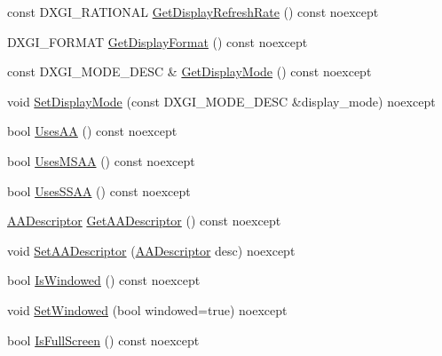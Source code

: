 \begin{DoxyCompactItemize}
\item 
const D\+X\+G\+I\+\_\+\+R\+A\+T\+I\+O\+N\+AL \hyperlink{classmage_1_1rendering_1_1_display_configuration_ae100fc84cd1900e302fb784f429a06b7}{Get\+Display\+Refresh\+Rate} () const noexcept
\item 
D\+X\+G\+I\+\_\+\+F\+O\+R\+M\+AT \hyperlink{classmage_1_1rendering_1_1_display_configuration_a66c6757aa4c17227ab0e7022228f982a}{Get\+Display\+Format} () const noexcept
\item 
const D\+X\+G\+I\+\_\+\+M\+O\+D\+E\+\_\+\+D\+E\+SC \& \hyperlink{classmage_1_1rendering_1_1_display_configuration_af3cd8d29b8f6d6bc0fa1579260badf99}{Get\+Display\+Mode} () const noexcept
\item 
void \hyperlink{classmage_1_1rendering_1_1_display_configuration_a7cc6b9dcf3932a62bfd1416fc7b397ea}{Set\+Display\+Mode} (const D\+X\+G\+I\+\_\+\+M\+O\+D\+E\+\_\+\+D\+E\+SC \&display\+\_\+mode) noexcept
\item 
bool \hyperlink{classmage_1_1rendering_1_1_display_configuration_abbcb68e66c4a659cb169819a4f1d0d5d}{Uses\+AA} () const noexcept
\item 
bool \hyperlink{classmage_1_1rendering_1_1_display_configuration_a1cd8c25ade06ad47945ca0046e350749}{Uses\+M\+S\+AA} () const noexcept
\item 
bool \hyperlink{classmage_1_1rendering_1_1_display_configuration_ad233d7838a302fa0ce73cf06b1660404}{Uses\+S\+S\+AA} () const noexcept
\item 
\hyperlink{namespacemage_1_1rendering_a25c189fd1da946d7a8f0abdd4f0e6afa}{A\+A\+Descriptor} \hyperlink{classmage_1_1rendering_1_1_display_configuration_aa0273241195b287e8333f47554d8dc1f}{Get\+A\+A\+Descriptor} () const noexcept
\item 
void \hyperlink{classmage_1_1rendering_1_1_display_configuration_ae41a16a437d9a8e3cdf12024affbc1f6}{Set\+A\+A\+Descriptor} (\hyperlink{namespacemage_1_1rendering_a25c189fd1da946d7a8f0abdd4f0e6afa}{A\+A\+Descriptor} desc) noexcept
\item 
bool \hyperlink{classmage_1_1rendering_1_1_display_configuration_acbe793e625311707e234fcd0977978d5}{Is\+Windowed} () const noexcept
\item 
void \hyperlink{classmage_1_1rendering_1_1_display_configuration_a78d0902979bd5a0eff7fef0aa7976a7f}{Set\+Windowed} (bool windowed=true) noexcept
\item 
bool \hyperlink{classmage_1_1rendering_1_1_display_configuration_a507e755923af2ba1338cc041b5df8e0a}{Is\+Full\+Screen} () const noexcept
\item 

\end{DoxyCompactItemize}
